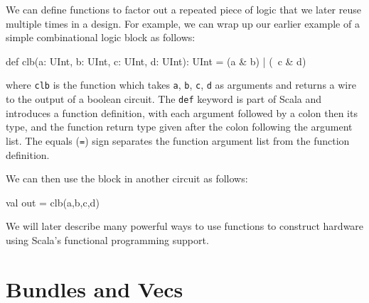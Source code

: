 \documentclass[twocolumn,10pt]{article}
\def\code#1{{\tt #1}}
\begin{document}
We can define functions to factor out a repeated piece of logic that
we later reuse multiple times in a design.  For example, we can wrap
up our earlier example of a simple combinational logic block as
follows:
\begin{scala}
def clb(a: UInt, b: UInt, c: UInt, d: UInt): UInt = 
  (a & b) | (~c & d)
\end{scala}

\noindent
where \code{clb} is the function which takes \code{a}, \code{b},
\code{c}, \code{d} as arguments and returns a wire to the output of a
boolean circuit.  The \code{def} keyword is part of Scala and
introduces a function definition, with each argument followed by a colon then its type,
and the function return type given after the colon following the
argument list.  The equals (\code{=})
sign separates the function argument list from the function
definition.

We can then use the block in another circuit as follows:
\begin{scala}
val out = clb(a,b,c,d)
\end{scala}






We will later describe many powerful ways to use functions to
construct hardware using Scala's functional programming support.

\section{Bundles and Vecs}
\end{document}
